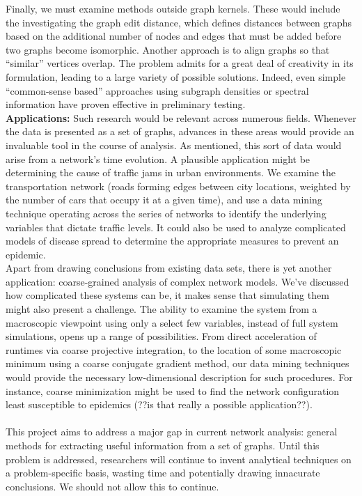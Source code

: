 \documentclass[11pt]{article}
\begin{document}
\indent Finally, we must examine methods outside graph kernels. These would include the investigating the graph edit distance, which defines distances between graphs based on the additional number of nodes and edges that must be added before two graphs become isomorphic. Another approach is to align graphs so that ``similar'' vertices overlap. The problem admits for a great deal of creativity in its formulation, leading to a large variety of possible solutions. Indeed, even simple ``common-sense based'' approaches using subgraph densities or spectral information have proven effective in preliminary testing. \\
\textbf{Applications:} Such research would be relevant across numerous fields. Whenever the data is presented as a set of graphs, advances in these areas would provide an invaluable tool in the course of analysis. As mentioned, this sort of data would arise from a network's time evolution. A plausible application might be determining the cause of traffic jams in urban environments. We examine the transportation network (roads forming edges between city locations, weighted by the number of cars that occupy it at a given time), and use a data mining technique operating across the series of networks to identify the underlying variables that dictate traffic levels. It could also be used to analyze complicated models of disease spread to determine the appropriate measures to prevent an epidemic. \\
\indent Apart from drawing conclusions from existing data sets, there is yet another application: coarse-grained analysis of complex network models. We've discussed how complicated these systems can be, it makes sense that simulating them might also present a challenge. The ability to examine the system from a macroscopic viewpoint using only a select few variables, instead of full system simulations, opens up a range of possibilities. From direct acceleration of runtimes via coarse projective integration, to the location of some macroscopic minimum using a coarse conjugate gradient method, our data mining techniques would provide the necessary low-dimensional description for such procedures. For instance, coarse minimization might be used to find the network configuration least susceptible to epidemics (??is that really a possible application??).\\ \\
\indent This project aims to address a major gap in current network analysis: general methods for extracting useful information from a set of graphs. Until this problem is addressed, researchers will continue to invent analytical techniques on a problem-specific basis, wasting time and potentially drawing innacurate conclusions. We should not allow this to continue.
\end{document}

